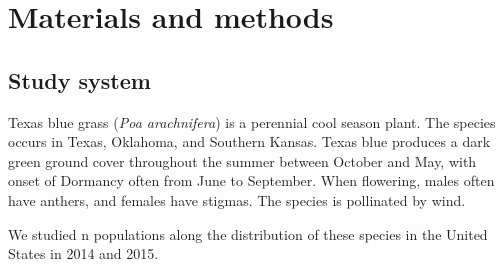 \documentclass[11pt]{article}
\begin{document}
\section*{Materials and methods}

\subsection*{Study system}
Texas blue grass (\textit{Poa arachnifera}) is a perennial cool season plant. 
The species occurs in Texas, Oklahoma, and Southern Kansas. 
Texas blue produces a dark green ground cover throughout the summer between October and May, with onset of Dormancy often from June to September.
When flowering, males often have anthers, and females have stigmas. The species is pollinated by wind. 

We studied n populations along the distribution of these species in the United States in 2014 and 2015. 



\end{document}
